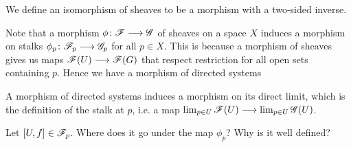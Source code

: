 We define an isomorphism of sheaves to be a morphism with a two-sided inverse.

Note that a morphism $\phi\colon\mathscr{F}\longrightarrow\mathscr{G}$ of sheaves on a space $X$ induces a morphism on stalks $\phi_p\colon\mathscr{F}_p\longrightarrow\mathscr{G}_p$ for all $p\in X$. This is because a morphism of sheaves gives us maps $\mathscr{F}(U)\longrightarrow\mathscr{F}(G)$ that respect restriction for all open sets containing $p$. Hence we have a morphism of directed systems 
\begin{center}
\end{center}
A morphism of directed systems induces a morphism on its direct limit, which is the definition of the stalk at $p$, i.e. a map $\lim_{p\in U}\mathscr{F}(U)\longrightarrow \lim_{p\in U}\mathscr{G}(U)$. 

\begin{problem}
Let $[U, f]\in \mathscr{F}_p$. Where does it go under the map $\phi_p$? Why is it well defined?
\end{problem}

